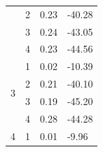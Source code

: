 \begin{table}[H]
\begin{tabular}{|c|c|l|l|}
    & 2                                                                            & 0.23                                                                                                  & -40.28                                                                                                \\ \cline{2-4} 
    & 3                                                                            & 0.24                                                                                                  & -43.05                                                                                                \\ \cline{2-4} 
    & 4                                                                            & 0.23                                                                                                  & -44.56                                                                                                \\ \hline
  \multirow{4}{*}{3}                                                           & 1                                                                            & 0.02                                                                                                  & -10.39                                                                                                \\ \cline{2-4} 
    & 2                                                                            & 0.21                                                                                                  & -40.10                                                                                                \\ \cline{2-4} 
    & 3                                                                            & 0.19                                                                                                  & -45.20                                                                                                \\ \cline{2-4} 
    & 4                                                                            & 0.28                                                                                                  & -44.28                                                                                                \\ \hline
  \multirow{4}{*}{4}                                                           & 1                                                                            & 0.01                                                                                                  & -9.96                                                                                                 \\ \cline{2-4} 

\end{tabular}
\end{table}
